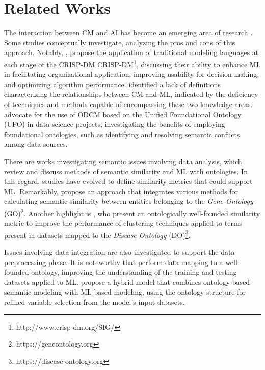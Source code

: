 \documentclass[
]{ceurart}
\begin{document}
\section{Related Works}

The interaction between CM and AI has become an emerging area of research \cite{bork2023conceptual}. Some studies conceptually investigate, analyzing the pros and cons of this approach. Notably, \cite{lukyanenko2019using}, propose the application of traditional modeling languages at each stage of the CRISP-DM CRISP-DM\footnote{http://www.crisp-dm.org/SIG/}, discussing their ability to enhance ML in facilitating organizational application, improving usability for decision-making, and optimizing algorithm performance. \cite{maass2021pairing} identified a lack of definitions characterizing the relationships between CM and ML, indicated by the deficiency of techniques and methods capable of encompassing these two knowledge areas. \cite{amaral2021foundational} advocate for the use of ODCM based on the Unified Foundational Ontology (UFO) \cite{guizzardi2022ufo} in data science projects, investigating the benefits of employing foundational ontologies, such as identifying and resolving semantic conflicts among data sources.

\par There are works investigating semantic issues involving data analysis, which review and discuss methods of semantic similarity and ML with ontologies. In this regard, studies have evolved to define similarity metrics that could support ML. Remarkably, \cite{kulmanov2020ontologiesml} propose an approach that integrates various methods for calculating semantic similarity between entities belonging to the \textit{Gene Ontology} (GO)\footnote{https://geneontology.org}.  Another highlight is \cite{maddalena2022application}, who present an ontologically well-founded similarity metric to improve the performance of clustering techniques applied to terms present in datasets mapped to the \textit{Disease Ontology }(DO)\footnote{https://disease-ontology.org}.

\par Issues involving data integration are also investigated to support the data preprocessing phase. It is noteworthy that \cite{silva2022evasao} perform data mapping to a well-founded ontology, improving the understanding of the training and testing datasets applied to ML. \cite{decoste2023hybrid} propose a hybrid model that combines ontology-based semantic modeling with ML-based modeling, using the ontology structure for refined variable selection from the model's input datasets.
\end{document}
